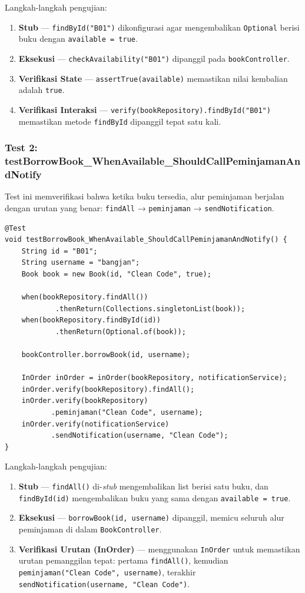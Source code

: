 \documentclass[a4paper,oneside,12pt]{report}
\begin{document}
Langkah-langkah pengujian:
\begin{enumerate}
    \item \textbf{Stub} --- \texttt{findById("B01")} dikonfigurasi agar mengembalikan \texttt{Optional} berisi buku dengan \texttt{available = true}.
    \item \textbf{Eksekusi} --- \texttt{checkAvailability("B01")} dipanggil pada \texttt{bookController}.
    \item \textbf{Verifikasi State} --- \texttt{assertTrue(available)} memastikan nilai kembalian adalah \texttt{true}.
    \item \textbf{Verifikasi Interaksi} --- \texttt{verify(bookRepository).findById("B01")} memastikan metode \texttt{findById} dipanggil tepat satu kali.
\end{enumerate}

\subsubsection{Test 2: testBorrowBook\_WhenAvailable\_ShouldCallPeminjamanAndNotify}

Test ini memverifikasi bahwa ketika buku tersedia, alur peminjaman berjalan dengan urutan yang benar: \texttt{findAll} → \texttt{peminjaman} → \texttt{sendNotification}.

\begin{lstlisting}[style=javastyle, caption={BookTest.java -- testBorrowBook\_WhenAvailable}]
@Test
void testBorrowBook_WhenAvailable_ShouldCallPeminjamanAndNotify() {
    String id = "B01";
    String username = "bangjan";
    Book book = new Book(id, "Clean Code", true);

    when(bookRepository.findAll())
            .thenReturn(Collections.singletonList(book));
    when(bookRepository.findById(id))
            .thenReturn(Optional.of(book));

    bookController.borrowBook(id, username);

    InOrder inOrder = inOrder(bookRepository, notificationService);
    inOrder.verify(bookRepository).findAll();
    inOrder.verify(bookRepository)
           .peminjaman("Clean Code", username);
    inOrder.verify(notificationService)
           .sendNotification(username, "Clean Code");
}
\end{lstlisting}

Langkah-langkah pengujian:
\begin{enumerate}
    \item \textbf{Stub} --- \texttt{findAll()} di-\textit{stub} mengembalikan list berisi satu buku, dan \texttt{findById(id)} mengembalikan buku yang sama dengan \texttt{available = true}.
    \item \textbf{Eksekusi} --- \texttt{borrowBook(id, username)} dipanggil, memicu seluruh alur peminjaman di dalam \texttt{BookController}.
    \item \textbf{Verifikasi Urutan (InOrder)} --- menggunakan \texttt{InOrder} untuk memastikan urutan pemanggilan tepat: pertama \texttt{findAll()}, kemudian \texttt{peminjaman("Clean Code", username)}, terakhir \texttt{sendNotification(username, "Clean Code")}.
\end{enumerate}
\end{document}
